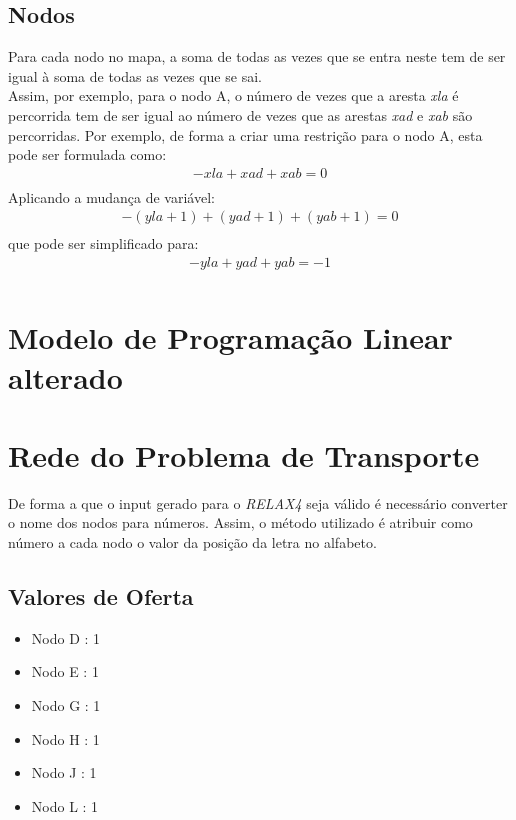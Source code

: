 \documentclass[a4paper]{report}
\begin{document}
\subsection{Nodos}
Para cada nodo no mapa, a soma de todas as vezes que se entra neste
tem de ser igual à soma de todas as vezes que se sai.\\
Assim, por exemplo, para o nodo A, o número de vezes que a aresta
\textit{xla} é percorrida tem de ser igual ao número de vezes que
as arestas \textit{xad} e \textit{xab} são percorridas.
Por exemplo, de forma a criar uma restrição para o nodo A, esta pode ser
formulada como:\\
\begin{multline}
- xla + xad + xab = 0 \\
\end{multline}
Aplicando a mudança de variável:
\begin{multline}
- (yla + 1) + (yad +1) + (yab +1) = 0 \\
\end{multline}
que pode ser simplificado para:
\begin{multline}
- yla + yad + yab = -1\\
\end{multline}

\pagebreak
\section{Modelo de Programação Linear alterado}


\pagebreak
\section{Rede do Problema de Transporte}
De forma a que o input gerado para o \textit{RELAX4} seja válido é necessário
converter o nome dos nodos para números. Assim, o método utilizado é atribuir
como número a cada nodo o valor da posição da letra no alfabeto.


\subsection{Valores de Oferta}
\begin{itemize}
    \item Nodo D : 1
    \item Nodo E : 1
    \item Nodo G : 1
    \item Nodo H : 1
    \item Nodo J : 1
    \item Nodo L : 1
\end{itemize}
\end{document}

